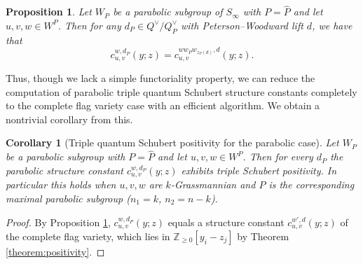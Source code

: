 \documentclass{amsart}
\newtheorem{corollary}[lemma]{Corollary}
\newtheorem{proposition}[lemma]{Proposition}
\theoremstyle{definition}
\theoremstyle{remark}
\numberwithin{equation}{section}
\newcommand{\pcomp}[1]{\widehat{#1}}
\begin{document}
 \begin{proposition} \label{prop:parabolic}
Let $W_P$ be a parabolic subgroup of $S_\infty$ with $P=\pcomp{P}$ and let $u,v,w\in W^{P}$. Then for any $d_P\in Q^\vee/Q_P^\vee$ with Peterson--Woodward lift $d$, we have that
$$c_{u,v}^{w,d_P}(y;z) = c_{u,v}^{ww_Pw_{z_P(d)},d}(y;z).$$
\end{proposition}

Thus, though we lack a simple functoriality property, we can reduce the computation of parabolic triple quantum Schubert structure constants completely to the complete flag variety case with an efficient algorithm. We obtain a nontrivial corollary from this.

\begin{corollary}[Triple quantum Schubert positivity for the parabolic case] \label{corollary:parabolicpositivity}
Let $W_P$ be a parabolic subgroup with $P=\pcomp P$ and let $u,v,w\in W^P$. Then for every $d_P$ the parabolic structure constant $c_{u,v}^{w,d_P}(y;z)$ exhibits triple Schubert positivity. In particular this holds when $u,v,w$ are $k$-Grassmannian and $P$ is the corresponding maximal parabolic subgroup ($n_1=k$, $n_2=n-k$).
\end{corollary}
\begin{proof}
By Proposition \ref{prop:parabolic}, $c_{u,v}^{w,d_P}(y;z)$ equals a structure constant $c_{u,v}^{w',d}(y;z)$ of the complete flag variety, which lies in $\mathbb Z_{\geq0}[y_i-z_j]$ by Theorem \ref{theorem:positivity}.
\end{proof}
\end{document}
